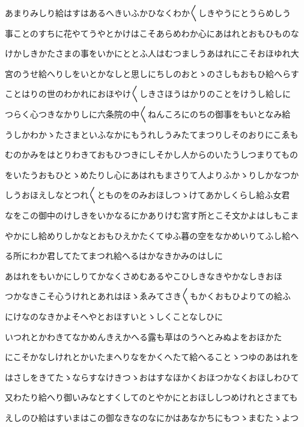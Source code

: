 \documentclass[a4paper,11pt,landscape]{ltjtarticle}
\begin{document}
\par\medskip
あまりみしり給はすはあるへきいふかひなくわか〱しきやうにとうらめしう
\par\medskip
事ことのすちに花やてうやとかけはこそあらめわか心にあはれとおもひものな
\par\medskip
けかしきかたさまの事をいかにととふ人はむつましうあはれにこそおほゆれ大
\par\medskip
宮のうせ給へりしをいとかなしと思しにちしのおとゝのさしもおもひ給へらす
\par\medskip
ことはりの世のわかれにおほやけ〱しきさほうはかりのことをけうし給しに
\par\medskip
つらく心つきなかりしに六条院の中〱ねんころにのちの御事をもいとなみ給
\par\medskip
うしかわかゝたさまといふなかにもうれしうみたてまつりしそのおりにこゑも
\par\medskip
むのかみをはとりわきておもひつきにしそかし人からのいたうしつまりてもの
\par\medskip
をいたうおもひとゝめたりし心にあはれもまさりて人よりふかゝりしかなつか
\par\medskip
しうおほえしなとつれ〱とものをのみおほしつゝけてあかしくらし給ふ女君
\par\medskip
なをこの御中のけしきをいかなるにかありけむ宮す所とこそ文かよはしもこま
\par\medskip
やかにし給めりしかなとおもひえかたくてゆふ暮の空をなかめいりてふし給へ
\par\medskip
る所にわか君してたてまつれ給へるはかなきかみのはしに
\par\medskip
あはれをもいかにしりてかなくさめむあるやこひしきなきやかなしきおほ
\par\medskip
つかなきこそ心うけれとあれはほゝゑみてさき〱もかくおもひよりての給ふ
\par\medskip
にけなのなきかよそへやとおほすいとゝしくことなしひに
\par\medskip
いつれとかわきてなかめんきえかへる露も草はのうへとみぬよをおほかた
\par\medskip
にこそかなしけれとかいたまへりなをかくへたて給へることゝつゆのあはれを
\par\medskip
はさしをきてたゝならすなけきつゝおはすなほかくおほつかなくおほしわひて
\par\medskip
又わたり給へり御いみなとすくしてのとやかにとおほししつめけれとさまても
\par\medskip
えしのひ給はすいまはこの御なきなのなにかはあなかちにもつゝまむたゝよつ
\par\medskip
\end{document}
